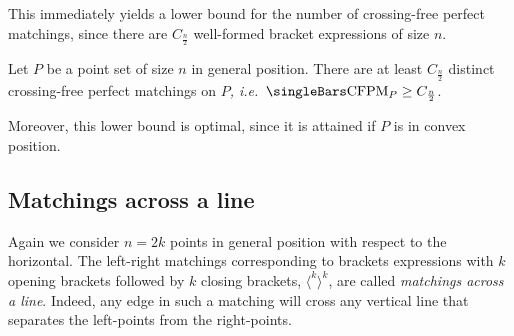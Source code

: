 \documentclass[10pt, a4paper, twoside]{basestyle}
\newcommand{\idest}{\emph{, i.e.\ }}
\DeclareMathOperator{\CFPM}{CFPM}
\begin{document}
This immediately yields a lower bound for the number of crossing-free perfect matchings, since
there are $C_{\frac n 2}$ well-formed bracket expressions of size $n$.
\begin{corollary}
Let $P$ be a point set of size $n$ in general position. There are at least $C_{\frac n 2}$ distinct
crossing-free perfect matchings on $P$\idest $\Cardinality{\CFPM_P} \geq C_{\frac n 2}$.
\end{corollary}
Moreover, this lower bound is optimal, since it is attained if $P$ is in convex position.
\subsection{Matchings across a line}
Again we consider $n=2k$ points in general position with respect to the horizontal.
The left-right matchings corresponding to brackets expressions with $k$ opening brackets followed
by $k$ closing brackets, $\langle^k\rangle^k$, are called \emph{matchings
across a line}. Indeed, any edge in such a matching will cross any vertical line that separates
the left-points from the right-points.
\end{document}
